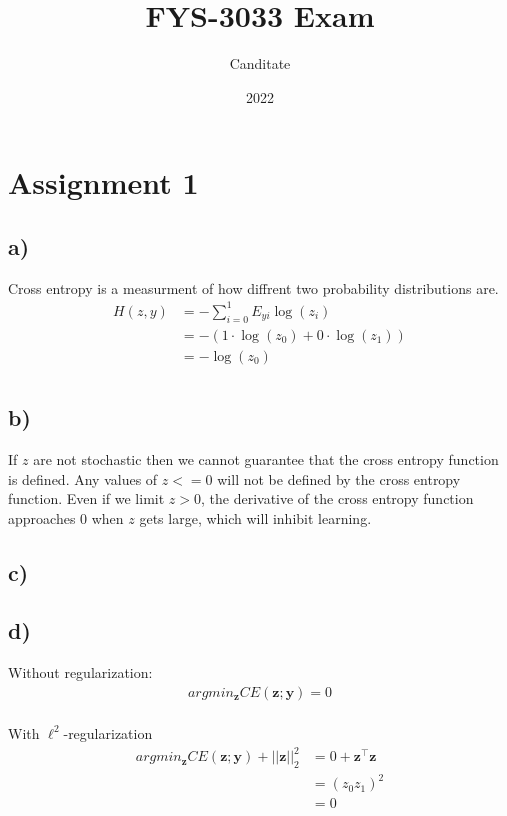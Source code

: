 \documentclass{article}
\title{FYS-3033 Exam}
\author{Canditate}
\date{2022}
\begin{document}
\maketitle
\section{Assignment 1}
\subsection*{a)}
Cross entropy is a measurment of how diffrent two probability distributions are.
\begin{equation}
    \begin{split}
        H(z,y) &= -\sum_{i=0}^1 E_{yi}\log(z_i)\\
        &= -\left(1\cdot\log(z_0)+0\cdot\log(z_1)\right)\\
        &= -\log(z_0)\\    
    \end{split}
\end{equation}

\subsection*{b)}
If $z$ are not stochastic then we cannot guarantee that the cross entropy function is defined. Any values of $z <= 0$ will not be defined by the cross entropy function. Even if we limit $z > 0$, the derivative of the cross entropy function approaches $0$ when $z$ gets large, which will inhibit learning.

\subsection*{c)}
\subsection*{d)}

Without regularization:
\begin{equation}
    \begin{split}
        argmin_\mathbf{z} CE(\mathbf{z}; \mathbf{y}) = 0\\
    \end{split}
\end{equation}

With $\ell^2$-regularization
\begin{equation}
    \begin{split}
        argmin_\mathbf{z} CE(\mathbf{z}; \mathbf{y}) + ||\mathbf{z}||^2_2 &= 0 + \mathbf{z}^\top\mathbf{z}\\
                                                                          &= (z_0z_1)^2\\
                                                                          &= 0\\
    \end{split}
\end{equation}
\end{document}

